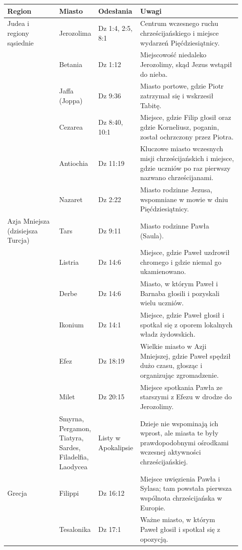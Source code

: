 \begin{longtable}[]{@{}p{0.22\linewidth} p{0.15\linewidth} p{0.15\linewidth} p{0.43\linewidth}@{}}
\toprule
\textbf{Region} & \textbf{Miasto} & \textbf{Odesłania} & \textbf{Uwagi} \\
\midrule
\endhead
Judea i regiony sąsiednie & Jerozolima & Dz 1:4, 2:5, 8:1 & Centrum wczesnego ruchu chrześcijańskiego i miejsce wydarzeń Pięćdziesiątnicy. \\
 & Betania & Dz 1:12 & Miejscowość niedaleko Jerozolimy, skąd Jezus wstąpił do nieba. \\
 & Jaffa (Joppa) & Dz 9:36 & Miasto portowe, gdzie Piotr zatrzymał się i wskrzesił Tabitę. \\
 & Cezarea & Dz 8:40, 10:1 & Miejsce, gdzie Filip głosił oraz gdzie Korneliusz, poganin, został ochrzczony przez Piotra. \\
 & Antiochia & Dz 11:19 & Kluczowe miasto wczesnych misji chrześcijańskich i miejsce, gdzie uczniów po raz pierwszy nazwano chrześcijanami. \\
 & Nazaret & Dz 2:22 & Miasto rodzinne Jezusa, wspomniane w mowie w dniu Pięćdziesiątnicy. \\
\midrule
Azja Mniejsza (dzisiejsza Turcja) & Tars & Dz 9:11 & Miasto rodzinne Pawła (Saula). \\
 & Listria & Dz 14:6 & Miejsce, gdzie Paweł uzdrowił chromego i gdzie niemal go ukamienowano. \\
 & Derbe & Dz 14:6 & Miasto, w którym Paweł i Barnaba głosili i pozyskali wielu uczniów. \\
 & Ikonium & Dz 14:1 & Miejsce, gdzie Paweł głosił i spotkał się z oporem lokalnych władz żydowskich. \\
 & Efez & Dz 18:19 & Wielkie miasto w Azji Mniejszej, gdzie Paweł spędził dużo czasu, głosząc i organizując zgromadzenie. \\
 & Milet & Dz 20:15 & Miejsce spotkania Pawła ze starszymi z Efezu w drodze do Jerozolimy. \\
 & Smyrna, Pergamon, Tiatyra, Sardes, Filadelfia, Laodycea & Listy w Apokalipsie & Dzieje nie wspominają ich wprost, ale miasta te były prawdopodobnymi ośrodkami wczesnej aktywności chrześcijańskiej. \\
\midrule
Grecja & Filippi & Dz 16:12 & Miejsce uwięzienia Pawła i Sylasa; tam powstała pierwsza wspólnota chrześcijańska w Europie. \\
 & Tesalonika & Dz 17:1 & Ważne miasto, w którym Paweł głosił i spotkał się z opozycją. \\

\end{longtable}
